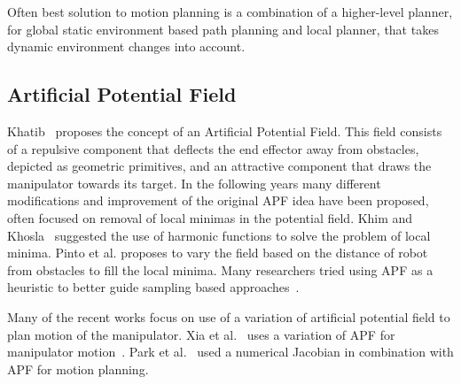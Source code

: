 \documentclass[letterpaper, 10 pt, conference]{ieeeconf}  %
\begin{document}
Often best solution to motion planning is a combination of a higher-level planner, for global static environment based path planning and local planner, that takes dynamic environment changes into account.

%

\subsection{Artificial Potential Field}

Khatib~\cite{c33} proposes the concept of an Artificial Potential Field. This field consists of a repulsive component that deflects the end effector away from obstacles, depicted as geometric primitives, and an attractive component that draws the manipulator towards its target. In the following years many different modifications and improvement of the original APF idea have been proposed, often focused on removal of local minimas in the potential field. Khim and Khosla~\cite{c40} suggested the use of harmonic functions to solve the problem of local minima. Pinto et al. \cite{c43} proposes to vary the field based on the distance of robot from obstacles to fill the local minima. Many researchers tried using APF as a heuristic to better guide sampling based approaches~\cite{c45, c46, c47}.

Many of the recent works focus on use of a variation of artificial potential field to plan motion of the manipulator. Xia et al.~\cite{c49} uses a variation of APF for manipulator motion~\cite{c49}. Park et al.~\cite{park2020trajectory} used a numerical Jacobian in combination with APF for motion planning. 

\end{document}

